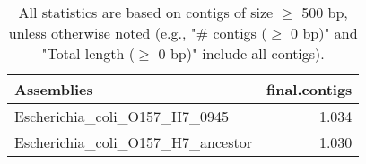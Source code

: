 \documentclass[12pt,a4paper]{article}
\begin{document}
\begin{table}[ht]
\begin{center}
\caption{All statistics are based on contigs of size $\geq$ 500 bp, unless otherwise noted (e.g., "\# contigs ($\geq$ 0 bp)" and "Total length ($\geq$ 0 bp)" include all contigs).}
\begin{tabular}{|l*{1}{|r}|}
\hline
Assemblies & final.contigs \\ \hline
Escherichia\_coli\_O157\_H7\_0945 & 1.034 \\ \hline
Escherichia\_coli\_O157\_H7\_ancestor & 1.030 \\ \hline
\end{tabular}
\end{center}
\end{table}
\end{document}
